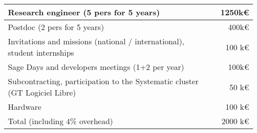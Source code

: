 \documentclass[a4,12pt]{amsart}
\newcommand{\TODO}[2][To do: ]{}
\begin{document}
\begin{tabular}{|l|r|}\hline
  Research engineer (5 pers for 5 years)                       & 1250k\euro          \\\hline
  Postdoc           (2 pers for 5 years)                       &  400k\euro\\\hline
  Invitations and missions (national / international), student internships & 100 k\euro          \\\hline
  Sage Days and developers meetings (1+2 per year)             & 100k\euro    \\\hline
  Subcontracting, participation to the Systematic cluster (GT Logiciel Libre)  & 50 k\euro\\\hline
  Hardware                                                     & 100 k\euro\\\hline
  Total (including 4\% overhead)                               & 2000 k\euro\\\hline
\end{tabular}


\end{document}
